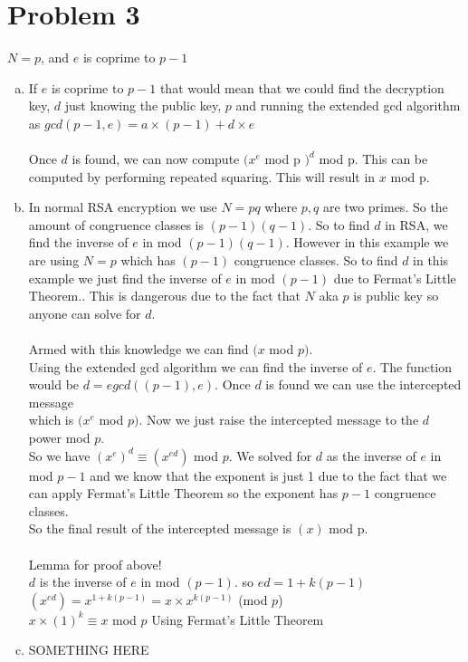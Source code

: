 \documentclass[11pt,letterpaper]{article}
\begin{document}
\section*{Problem 3}
$N=p$, and $e$ is coprime to $p-1$ 
\begin{enumerate}[(a)]
\item
If $e$ is coprime to $p-1$ that would mean that we could find the decryption key, $d$ just knowing the public key, $p$ and running the extended gcd algorithm as $gcd(p-1,e) = a\times(p-1)+d\times e$\\
\\
Once $d$ is found, we can now compute $(x^{e}$ mod p $)^{d}$ mod p. This can be computed by performing repeated squaring. This will result in $x$ mod p.\\

\item
In normal RSA encryption we use $N=pq$ where $p,q$ are two primes. So the amount of congruence classes is $(p-1)(q-1)$. So to find $d$ in RSA, we find the inverse of $e$ in mod $(p-1)(q-1)$. However in this example we are using $N=p$ which has $(p-1)$ congruence classes. So to find $d$ in this example we just find the inverse of $e$ in mod $(p-1)$ due to Fermat's Little Theorem.. This is dangerous due to the fact that $N$ aka $p$ is public key so anyone can solve for $d$.\\
\\
Armed with this knowledge we can find $(x$ mod $p)$.\\
Using the extended gcd algorithm we can find the inverse of $e$. The function would be $d = egcd((p-1),e)$. Once $d$ is found we can use the intercepted message\\ which is $(x^e$ mod $p)$. Now we just raise the intercepted message to the $d$ power mod $p$.\\ So we have $(x^e)^d\equiv (x^{ed})$ mod $p$. We solved for $d$ as the inverse of $e$ in mod $p-1$ and we know that the exponent is just 1 due to the fact that we can apply Fermat's Little Theorem so the exponent has $p-1$ congruence classes. \\So the final result of the intercepted message is $(x)$ mod p.
\\\\
Lemma for proof above!\\
$d$ is the inverse of $e$ in mod $(p-1)$. so $ed =1+k(p-1)$\\
$(x^{ed})= x^{1+k(p-1)} = x\times x^{k(p-1)}$ (mod $p$)\\
$x\times(1)^k \equiv x $ mod $p$ \hfill Using Fermat's Little Theorem
\item
SOMETHING HERE
\end{enumerate}
\clearpage
\end{document}
